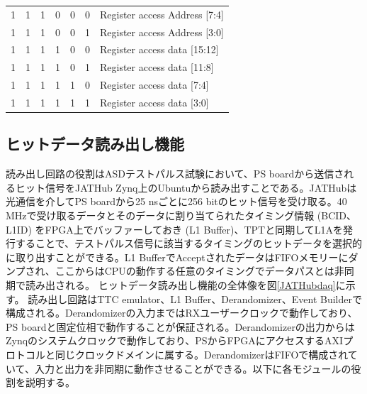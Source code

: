 \begin{table}[]
\begin{tabular}{|cccccc|l|}
    \multicolumn{1}{|c}{1} & 1                      & 1                      & 0                      & 0                      & 0 & Register access Address {[}7:4{]}      \\  
    \multicolumn{1}{|c}{1} & 1                      & 1                      & 0                      & 0                      & 1 & Register access Address {[}3:0{]}      \\  \hline
    \multicolumn{1}{|c}{1} & 1                      & 1                      & 1                      & 0                      & 0 & Register access data {[}15:12{]}       \\  
    \multicolumn{1}{|c}{1} & 1                      & 1                      & 1                      & 0                      & 1 & Register access data {[}11:8{]}        \\  
    \multicolumn{1}{|c}{1} & 1                      & 1                      & 1                      & 1                      & 0 & Register access data {[}7:4{]}         \\  
    \multicolumn{1}{|c}{1} & 1                      & 1                      &1                       & 1                      & 1 & Register access data {[}3:0{]}         \\  \hline
    \end{tabular}
    \end{table}

\subsection*{ヒットデータ読み出し機能}
\label{subsubsec_DAQ}
読み出し回路の役割はASDテストパルス試験において、PS boardから送信されるヒット信号をJATHub Zynq上のUbuntuから読み出すことである。JATHubは光通信を介してPS boardから25 nsごとに256 bitのヒット信号を受け取る。40 MHzで受け取るデータとそのデータに割り当てられたタイミング情報 (BCID、L1ID) をFPGA上でバッファーしておき (L1 Buffer)、TPTと同期してL1Aを発行することで、テストパルス信号に該当するタイミングのヒットデータを選択的に取り出すことができる。L1 BufferでAcceptされたデータはFIFOメモリーにダンプされ、ここからはCPUの動作する任意のタイミングでデータパスとは非同期で読み出される。
ヒットデータ読み出し機能の全体像を図\ref{JATHubdaq}に示す。
読み出し回路はTTC emulator、L1 Buffer、Derandomizer、Event Builderで構成される。Derandomizerの入力まではRXユーザークロックで動作しており、PS boardと固定位相で動作することが保証される。Derandomizerの出力からはZynqのシステムクロックで動作しており、PSからFPGAにアクセスするAXIプロトコルと同じクロックドメインに属する。DerandomizerはFIFOで構成されていて、入力と出力を非同期に動作させることができる。以下に各モジュールの役割を説明する。

